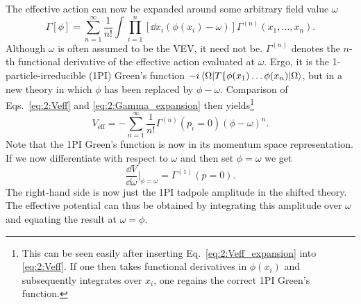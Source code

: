 The effective action can now be expanded around some arbitrary field value $\omega$
\begin{equation}
\Gamma [\phi] = \sum_{n = 1}^\infty \frac{1}{n!} \int \prod_{i = 1}^{n} \left[\dd x_i \left(\phi (x_i) - \omega \right) \right] \Gamma^{(n)}(x_1, \ldots, x_n).
\label{eq:2:Gamma_expansion}
\end{equation}
Although $\omega$ is often assumed to be the \acs{VEV}, it need not be. $\Gamma^{(n)}$ denotes the $n$-th functional derivative of the effective action evaluated at $\omega$. Ergo, it is the 1-particle-irreducible (\acs{1PI}) Green's function $-i\braket{\Omega |T \lbrace \phi(x_1) \dots \phi (x_n)|\Omega}$, but in a new theory in which $\phi$ has been replaced by $\phi - \omega$. Comparison of Eqs.~\eqref{eq:2:Veff} and \eqref{eq:2:Gamma_expansion} then yields\footnote{This can be seen easily after inserting Eq.~\eqref{eq:2:Veff_expansion} into \eqref{eq:2:Veff}. If one then takes functional derivatives in $\phi(x_i)$ and subsequently integrates over $x_i$, one regains the correct \acs{1PI} Green's function.}
\begin{equation}
V_\text{eff} = - \sum_{n = 1}^\infty \frac{1}{n!} \Gamma^{(n)} (p_i = 0) \left( \phi - \omega \right)^n.
\label{eq:2:Veff_expansion}
\end{equation}
Note that the \acs{1PI} Green's function is now in its momentum space representation. If we now differentiate with respect to $\omega$ and then set $\phi = \omega$ we get
\begin{equation}
\frac{\dd V}{\dd \omega} \bigg \vert_{\phi = \omega} =  \Gamma^{(1)} (p = 0).
\label{eq:2:Veff_diff}
\end{equation}
The right-hand side is now just the \acs{1PI} tadpole amplitude in the shifted theory. The effective potential can thus be obtained by integrating this amplitude over $\omega$ and equating the result at $\omega = \phi$.

